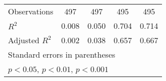 {\begin{tabular}{l*{4}{c}}
\hline
Observations        &         497         &         497         &         495         &         495         \\
\(R^{2}\)           &       0.008         &       0.050         &       0.704         &       0.714         \\
Adjusted \(R^{2}\)  &       0.002         &       0.038         &       0.657         &       0.667         \\
\hline\hline
\multicolumn{5}{l}{\footnotesize Standard errors in parentheses}\\
\multicolumn{5}{l}{\footnotesize \sym{*} \(p<0.05\), \sym{**} \(p<0.01\), \sym{***} \(p<0.001\)}\\
\end{tabular}
}
